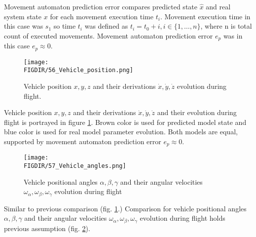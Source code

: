 \noindent Movement automaton prediction error compares predicted state $\hat{x}$ and real system state $x$ for each movement execution time $t_i$. Movement execution time in this case was $s_1$ so time $t_i$ was defined as $t_i=t_0+i, i\in\{1,\dots,n\}$, where n is total count of executed movements. Movement automaton prediction error $e_p$ was in this case $e_p\approx 0$.
\begin{figure}[H]
    \centering
    \texttt{[image: \\FIGDIR/56\_Vehicle\_position.png]}
    \caption{Vehicle position $x,y,z$ and their derivations $\dot{x},\dot{y},\dot{z}$ evolution during flight.}
    \label{fig:vehicleStateKnown1}
\end{figure}
\noindent Vehicle position $x,y,z$ and their derivations $\dot{x},\dot{y},\dot{z}$ and their evolution during flight is portrayed in figure \ref{fig:vehicleStateKnown1}. Brown color is used for predicted model state and blue color is used for real model parameter evolution. Both models are equal, supported by movement automaton prediction error $e_p\approx 0$.
\begin{figure}[H]
    \centering
    \texttt{[image: \\FIGDIR/57\_Vehicle\_angles.png]}
    \caption{Vehicle positional angles $\alpha,\beta,\gamma$ and their angular velocities $\omega_\alpha,\omega_\beta,\omega_\gamma$ evolution during flight}
    \label{fig:vehicleStateKnown2}
\end{figure}
\noindent Similar to previous comparison (fig. \ref{fig:vehicleStateKnown1}.) Comparison for vehicle positional angles $\alpha,\beta,\gamma$ and their angular velocities $\omega_\alpha,\omega_\beta,\omega_\gamma$ evolution during flight holds previous assumption (fig. \ref{fig:vehicleStateKnown2}).
